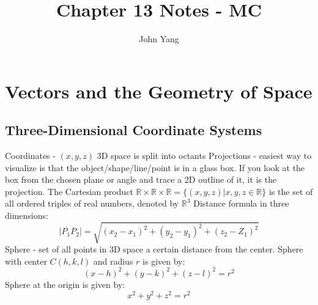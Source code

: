 \documentclass{article}
\title{Chapter 13 Notes - MC} %
\author{John Yang}
\begin{document}
    \maketitle
    \tableofcontents
    \section{Vectors and the Geometry of Space} %
    \subsection{Three-Dimensional Coordinate Systems} %
    \begin{outline}
        \1 Coordinates - \((x,y,z)\)
        \1 3D space is split into octants
        \1 Projections - easiest way to visualize is that the object/shape/line/point is in a glass box. If you look at the box from the chosen plane or angle and trace a 2D outline of it, it is the projection. 
        \1 The Cartesian product \(\mathbb{R}\times\mathbb{R}\times\mathbb{R}=\{(x,y,z)|x,y,z\in\mathbb{R}\}\) is the set of all ordered triples of real numbers, denoted by \(\mathbb{R}^3\)
        \1 Distance formula in three dimensions: \[|P_1P_2|=\sqrt{(x_2-x_1)^2+(y_2-y_1)^2+(z_2-Z_1)^2}\]
        \1 Sphere - set of all points in 3D space a certain distance from the center. 
            \2 Sphere with center \(C(h,k,l)\) and radius $r$ is given by: \[(x-h)^2+(y-k)^2+(z-l)^2=r^2\]
            \2 Sphere at the origin is given by: \[x^2+y^2+z^2=r^2\]
        
    \end{outline}
\end{document}
